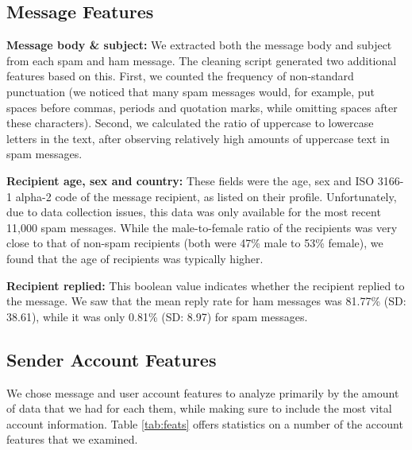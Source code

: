 \documentclass[preprint]{acm_proc_article-sp}
\begin{document}
\subsection{Message Features}

\textbf{Message body \& subject:} We extracted both the message body and subject from 
each spam and ham message. The cleaning script generated two additional features based 
on this. First, we counted the frequency of non-standard punctuation (we noticed that many 
spam messages would, for example, put spaces before commas, periods and quotation marks, 
while omitting spaces after these characters). Second, we calculated the ratio of uppercase to 
lowercase letters in the text, after observing relatively high amounts of uppercase text in 
spam messages.

\textbf{Recipient age, sex and country:} These fields were the age, sex and ISO 3166-1 alpha-2 code of the message 
recipient, as listed on their profile. Unfortunately, due to data collection issues, this data was only available 
for the most recent 11,000 spam messages. While the male-to-female ratio of the recipients was very close to that 
of non-spam recipients (both were 47\% male to 53\% female), we found that the age of recipients was typically higher.

\textbf{Recipient replied:} This boolean value indicates whether the recipient replied to the message. We saw 
that the mean reply rate for ham messages was 81.77\% (SD: 38.61), while it was only 0.81\% (SD: 8.97) for spam messages. 

\subsection{Sender Account Features}

We chose message and user account features to analyze primarily by the amount of data that 
we had for each them, while making sure to include the most vital account information. 
Table \ref{tab:feats} offers statistics on a number of the account features that we examined. 
\end{document}
